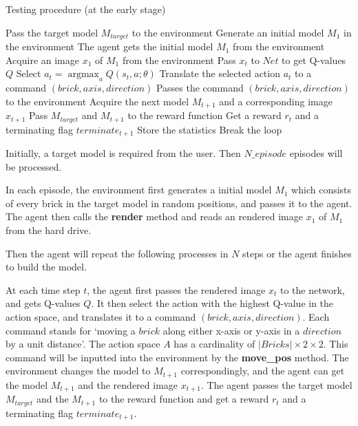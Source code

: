 \documentclass[a4paper]{article}
\DeclareMathOperator{\argmax}{argmax}
\begin{document}
		        \begin{algorithm}[]
		        	\caption{Testing procedure (at the early stage)} \label{alg:test1}
		        	\begin{algorithmic}[1]
		        		\State Pass the target model $M_{target}$ to the environment
		        		\State Generate an initial model $M_1$ in the environment
		        		\State The agent gets the initial model $M_1$ from the environment
		        		\State Acquire an image $x_1$ of $M_1$ from the environment
		        		\State Pass $x_t$ to $Net$ to get Q-values $Q$
		        		\State Select $a_t = \argmax_a Q(s_t, a;\theta)$
		        		\State Translate the selected action $a_t$ to a command $(brick, axis, direction)$
		        		\State Passes the command $(brick, axis, direction)$ to the environment
		        		\State Acquire the next model $M_{t+1}$ and a corresponding image $x_{t+1}$
		        		\State Pass $M_{target}$ and $M_{t+1}$ to the reward function
		        		\State Get a reward $r_t$ and a terminating flag $terminate_{t+1}$
		        		\State Store the statistics
		        		\State Break the loop 
		        		\EndIf
		        		
		        		\EndFor
		        		\EndProcedure
		        	\end{algorithmic}
		        \end{algorithm}
		        
		        Initially, a target model is required from the user. Then $N\_episode$ episodes will be processed. 
		        
		        In each episode, the environment first generates a initial model $M_1$ which consists of every brick in the target model in random positions, and passes it to the agent. The agent then calls the \textbf{render} method and reads an rendered image $x_1$ of $M_1$ from the hard drive. 
		        
		        \vspace{5mm}
		        
		        Then the agent will repeat the following processes in $N$ steps or the agent finishes to build the model. 
		        
		        At each time step $t$, the agent first passes the rendered image $x_t$ to the network, and gets Q-values $Q$. It then select the action with the highest Q-value in the action space, and translates it to a command $(brick, axis, direction)$. Each command stands for `moving a $brick$ along either x-axis or y-axis in a $direction$ by a unit distance'. The action space $A$ has a cardinality of $|Bricks| \times 2 \times 2$. This command will be inputted into the environment by the \textbf{move\_pos} method. The environment changes the model to $M_{t+1}$ correspondingly, and the agent can get the model $M_{t+1}$ and the rendered image $x_{t+1}$. The agent passes the target model $M_{target}$ and the $M_{t+1}$ to the reward function and get a reward $r_t$ and a terminating flag $terminate_{t+1}$. 
		        
\end{document}

